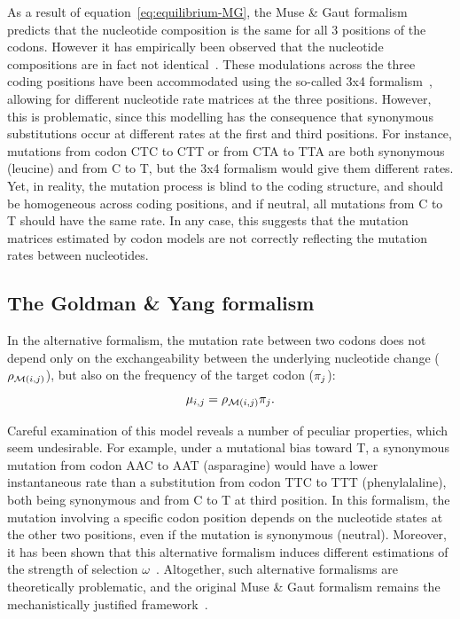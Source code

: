 As a result of equation~\ref{eq:equilibrium-MG}, the Muse \& Gaut formalism predicts that the nucleotide composition is the same for all $3$ positions of the codons.
However it has empirically been observed that the nucleotide compositions are in fact not identical~\citep{Singer2000}.
These modulations across the three coding positions have been accommodated using the so-called 3x4 formalism~\citep{Muse1994, Goldman1994}, allowing for different nucleotide rate matrices at the three positions.
However, this is problematic, since this modelling has the consequence that synonymous substitutions occur at different rates at the first and third positions.
For instance, mutations from codon CTC to CTT or from CTA to TTA are both synonymous (leucine) and from C to T, but the 3x4 formalism would give them different rates.
Yet, in reality, the mutation process is blind to the coding structure, and should be homogeneous across coding positions, and if neutral, all mutations from C to T should have the same rate.
In any case, this suggests that the mutation matrices estimated by codon models are not correctly reflecting the mutation rates between nucleotides.

\subsection{The Goldman \& Yang formalism}
\label{subsec:GY-formalism}

In the alternative \citet{Goldman1994} formalism, the mutation rate between two codons does not depend only on the exchangeability between the underlying nucleotide change ($\rho_{\mathcal{M}({i}, {j})}$), but also on the frequency of the target codon ($\pi_{{j}}$):
\begin{equation}
    \mu_{{i}, {j}} = \rho_{\mathcal{M}({i}, {j})} \pi_{{j}}.
\end{equation}

Careful examination of this model reveals a number of peculiar properties, which seem undesirable.
For example, under a mutational bias toward T, a synonymous mutation from codon AAC to AAT (asparagine) would have a lower instantaneous rate than a substitution from codon TTC to TTT (phenylalaline), both being synonymous and from C to T at third position.
In this formalism, the mutation involving a specific codon position depends on the nucleotide states at the other two positions, even if the mutation is synonymous (neutral).
Moreover, it has been shown that this alternative formalism induces different estimations of the strength of selection $\omega$~\citep{Pond2005a,Yap2010, Spielman2015}.
Altogether, such alternative formalisms are theoretically problematic, and the original Muse \& Gaut formalism remains the mechanistically justified framework~\citep{Rodrigue2008a}.

